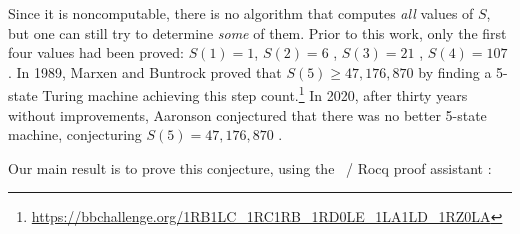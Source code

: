 \documentclass[11pt]{article}
\newcommand{\BBtheFifth}{47{,}176{,}870}
\theoremstyle{definition} %
\numberwithin{equation}{section}
\theoremstyle{definition} %
\begin{document}
Since it is noncomputable, there is no algorithm that computes \textit{all} values of $S$, but one can still try to determine \textit{some} of them. Prior to this work, only the first four values had been proved: $S(1)=1$, $S(2)=6$ \cite{Rado_1962}, $S(3) = 21$ \cite{Lin1963}, $S(4) = 107$ \cite{Brady83}. In 1989, Marxen and Buntrock proved that $S(5) \geq \BBtheFifth$ by finding a 5-state Turing machine achieving this step count.\footnote{\url{https://bbchallenge.org/1RB1LC_1RC1RB_1RD0LE_1LA1LD_1RZ0LA}} In 2020, after thirty years without improvements, Aaronson conjectured that there was no better 5-state machine, \ie conjecturing $S(5) = \BBtheFifth$ \cite{BusyBeaverFrontier}.





Our main result is to prove this conjecture, using the \Coq \ / Rocq proof assistant \cite{Coq8.20}:
\end{document}
